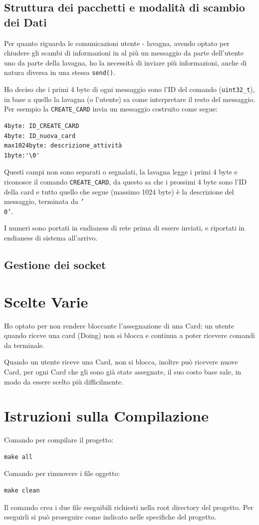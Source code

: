 \documentclass[12pt,a4paper, titlepage]{article}
\begin{document}
\subsection*{Struttura dei pacchetti e modalità di scambio dei Dati}
Per quanto riguarda le comunicazioni utente - lavagna, avendo optato per chiudere gli scambi di informazioni in al più un messaggio da parte dell'utente uno da parte della lavagna, ho la necessità di inviare più informazioni, anche di natura diversa in una stessa \texttt{send()}.

Ho deciso che i primi 4 byte di ogni messaggio sono l'ID del comando (\texttt{uint32\_t}), in base a quello la lavagna (o l'utente) sa come interpretare il resto del messaggio. Per esempio la \texttt{CREATE\_CARD} invia un messaggio costruito come segue:
\begin{verbatim}
4byte: ID_CREATE_CARD
4byte: ID_nuova_card
max1024byte: descrizione_attività
1byte:'\0'
\end{verbatim}
Questi campi non sono separati o segnalati, la lavagna legge i primi 4 byte e riconosce il comando \texttt{CREATE\_CARD}, da questo sa che i prossimi 4 byte sono l'ID della card e tutto quello che segue (massimo 1024 byte) è la descrizione del messaggio, terminata da \texttt{'\\0'}.

I numeri sono portati in endianess di rete prima di essere inviati, e riportati in endianess di sistema all'arrivo.

\subsection*{Gestione dei socket}

\section*{Scelte Varie}
Ho optato per non rendere bloccante l'assegnazione di una Card: un utente quando riceve una card (Doing) non si blocca e continua a poter ricevere comandi da terminale.

Quando un utente riceve una Card, non si blocca, inoltre può ricevere nuove Card, per ogni Card che gli sono già state assegnate, il suo costo base sale, in modo da essere scelto più difficilmente.

\section*{Istruzioni sulla Compilazione}
Comando per compilare il progetto:
\begin{verbatim}
make all
\end{verbatim}
Comando per rimuovere i file oggetto:
\begin{verbatim}
make clean
\end{verbatim}
Il comando crea i due file eseguibili richiesti nella root directory del progetto.
Per eseguirli si può proseguire come indicato nelle specifiche del progetto.
\end{document}
